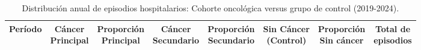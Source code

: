 \begin{table}[htbp]
\centering
\scriptsize
\setlength{\tabcolsep}{3pt}
\renewcommand{\arraystretch}{1.2}
\caption{Distribución anual de episodios hospitalarios: Cohorte oncológica versus grupo de control (2019-2024).}
\label{tab:distribucion_anual_cohorte}
\begin{tabular}{|c|c|c|c|c|c|c|c|}
\hline
\parbox[t]{1.5cm}{\centering\textbf{Período}} & 
\parbox[t]{1.8cm}{\centering\textbf{Cáncer\\Principal}} & 
\parbox[t]{1.5cm}{\centering\textbf{Proporción\\Principal}} & 
\parbox[t]{1.8cm}{\centering\textbf{Cáncer\\Secundario}} & 
\parbox[t]{1.5cm}{\centering\textbf{Proporción\\Secundario}} & 
\parbox[t]{2.0cm}{\centering\textbf{Sin Cáncer\\(Control)}} & 
\parbox[t]{1.5cm}{\centering\textbf{Proporción\\Sin cáncer}} & 
\parbox[t]{1.8cm}{\centering\textbf{Total de\\episodios}} \\ \hline


\end{tabular}
\end{table}

